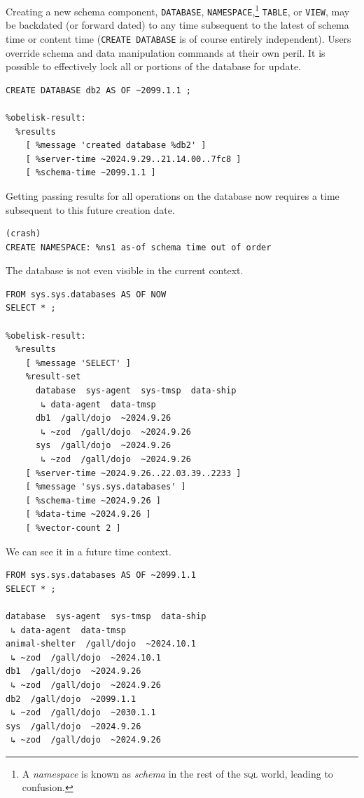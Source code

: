 \documentclass[twoside]{article}
\begin{document}
Creating a new schema component, \lstinline[style=inlinecode]{DATABASE}, \lstinline[style=inlinecode]{NAMESPACE},\footnote{A \emph{namespace} is known as \emph{schema} in the rest of the \textsc{sql} world, leading to confusion.} \lstinline[style=inlinecode]{TABLE}, or \lstinline[style=inlinecode]{VIEW}, may be backdated (or forward dated) to any time subsequent to the latest of schema time or content time (\lstinline[style=inlinecode]{CREATE DATABASE} is of course entirely independent). Users override schema and data manipulation commands at their own peril. It is possible to effectively lock all or portions of the database for update.

\begin{lstlisting}[style=listingcode_sql]
CREATE DATABASE db2 AS OF ~2099.1.1 ;

%obelisk-result:
  %results
    [ %message 'created database %db2' ]
    [ %server-time ~2024.9.29..21.14.00..7fc8 ]
    [ %schema-time ~2099.1.1 ]
\end{lstlisting}

\noindent
Getting passing results for all operations on the database now requires a time subsequent to this future creation date.

\begin{lstlisting}[style=listingcode_sql]
(crash)
CREATE NAMESPACE: %ns1 as-of schema time out of order
\end{lstlisting}

\noindent
The database is not even visible in the current context.

\begin{lstlisting}[style=listingcode_sql]
FROM sys.sys.databases AS OF NOW
SELECT * ;

%obelisk-result:
  %results
    [ %message 'SELECT' ]
    %result-set
      database  sys-agent  sys-tmsp  data-ship
       ↳ data-agent  data-tmsp
      db1  /gall/dojo  ~2024.9.26
       ↳ ~zod  /gall/dojo  ~2024.9.26
      sys  /gall/dojo  ~2024.9.26
       ↳ ~zod  /gall/dojo  ~2024.9.26
    [ %server-time ~2024.9.26..22.03.39..2233 ]
    [ %message 'sys.sys.databases' ]
    [ %schema-time ~2024.9.26 ]
    [ %data-time ~2024.9.26 ]
    [ %vector-count 2 ]
\end{lstlisting}

\noindent
We can see it in a future time context.

\begin{lstlisting}[style=listingcode_sql]
FROM sys.sys.databases AS OF ~2099.1.1
SELECT * ;

database  sys-agent  sys-tmsp  data-ship
 ↳ data-agent  data-tmsp
animal-shelter  /gall/dojo  ~2024.10.1
 ↳ ~zod  /gall/dojo  ~2024.10.1
db1  /gall/dojo  ~2024.9.26
 ↳ ~zod  /gall/dojo  ~2024.9.26
db2  /gall/dojo  ~2099.1.1
 ↳ ~zod  /gall/dojo  ~2030.1.1
sys  /gall/dojo  ~2024.9.26
 ↳ ~zod  /gall/dojo  ~2024.9.26
\end{lstlisting}
\end{document}
